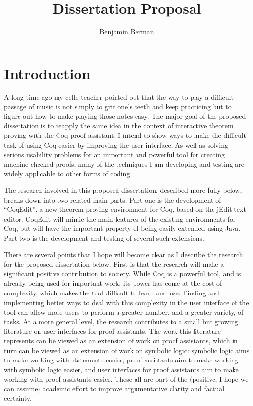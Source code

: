 \documentclass[11pt]{amsart}
\title{Dissertation Proposal}
\author{Benjamin Berman}
\begin{document}
\maketitle
\section{Introduction}

A long time ago my cello teacher pointed out that the way to play a difficult passage of music is not simply to grit one's teeth and keep practicing but to figure out how to make playing those notes easy.  The major goal of the proposed dissertation is to reapply the same idea in the context of interactive theorem proving with the Coq proof assistant\cite{Coq}:  I intend to show ways to make the difficult task of using Coq easier by improving the user interface.  As well as solving serious usability problems for an important and powerful tool for creating machine-checked proofs, many of the techniques I am developing and testing are widely applicable to other forms of coding.

The research involved in this proposed dissertation, described more fully below, breaks down into two related main parts.  Part one is the development of ``CoqEdit'', a new theorem proving environment for Coq, based on the jEdit text editor.  CoqEdit will mimic the main features of the existing environments for Coq, but will have the important property of being easily extended using Java.  Part two is the development and testing of several such extensions.

There are several points that I hope will become clear as I describe the research for the proposed dissertation below.  First is that the research will make a significant positive contribution to society.  While Coq is a powerful tool, and is already being used for important work, its power has come at the cost of complexity, which makes the tool difficult to learn and use.  Finding and implementing better ways to deal with this complexity in the user interface of the tool can allow more users to perform a greater number, and a greater variety, of tasks.  At a more general level, the research contributes to a small but growing literature on user interfaces for proof assistants.  The work this literature represents can be viewed as an extension of work on proof assistants, which in turn can be viewed as an extension of work on symbolic logic:  symbolic logic aims to make working with statements easier, proof assistants aim to make working with symbolic logic easier, and user interfaces for proof assistants aim to make working with proof assistants easier.  These all are part of the (positive, I hope we can assume) academic effort to improve argumentative clarity and factual certainty.  
	
\end{document}
